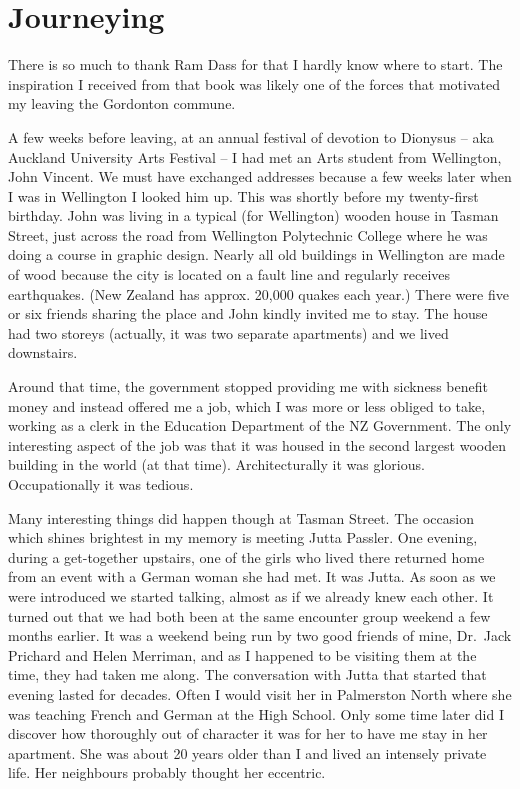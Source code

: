 \chapter{Journeying}

There is so much to thank Ram Dass for that I hardly know where to
start. The inspiration I received from that book was likely one of the
forces that motivated my leaving the Gordonton commune.

A few weeks before leaving, at an annual festival of devotion to
Dionysus -- aka Auckland University Arts Festival -- I had met an Arts
student from Wellington, John Vincent. We must have exchanged addresses
because a few weeks later when I was in Wellington I looked him up. This
was shortly before my twenty-first birthday. John was living in a typical (for
Wellington) wooden house in Tasman Street, just across the road from
Wellington Polytechnic College where he was doing a course in graphic
design. Nearly all old buildings in Wellington are made of wood because
the city is located on a fault line and regularly receives earthquakes.
(New Zealand has approx. 20,000 quakes\cite{quakes} each year.)
There were five or six friends sharing the place and John kindly invited
me to stay. The house had two storeys (actually, it was two separate
apartments) and we lived downstairs.

Around that time, the government stopped providing me with sickness
benefit money and instead offered me a job, which I was more or less
obliged to take, working as a clerk in the Education Department of the
NZ Government. The only interesting aspect of the job was that it was
housed in the second largest wooden building\cite{building} in the world (at that time).
Architecturally it was glorious. Occupationally it was tedious.

Many interesting things did happen though at Tasman Street. The occasion
which shines brightest in my memory is meeting Jutta Passler. One
evening, during a get-together upstairs, one of the girls who lived
there returned home from an event with a German woman she had met. It
was Jutta. As soon as we were introduced we started talking, almost as
if we already knew each other. It turned out that we had both been at
the same encounter group weekend a few months earlier. It was a weekend
being run by two good friends of mine, Dr.~Jack Prichard and Helen
Merriman, and as I happened to be visiting them at the time, they had
taken me along. The conversation with Jutta that started that evening
lasted for decades. Often I would visit her in Palmerston North where
she was teaching French and German at the High School. Only some time
later did I discover how thoroughly out of character it was for her to
have me stay in her apartment. She was about 20 years older than I and
lived an intensely private life. Her neighbours probably thought her
eccentric.

